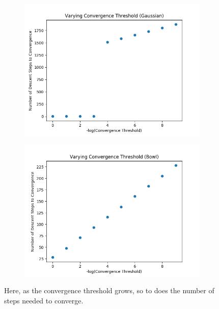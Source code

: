 \documentclass{article}
\begin{document}
\begin{figure}[H]
        \begin{subfigure}[b]{0.5\textwidth}
                \includegraphics[width=\linewidth]{../P1/figs/converge_gauss.png}
        \end{subfigure}%
        \begin{subfigure}[b]{0.5\textwidth}
                \includegraphics[width=\linewidth]{../P1/figs/converge_bowl.png}
        \end{subfigure}%
\caption*{Here, as the convergence threshold grows, so to does the number of steps needed to converge.}
\end{figure}
\end{document}
